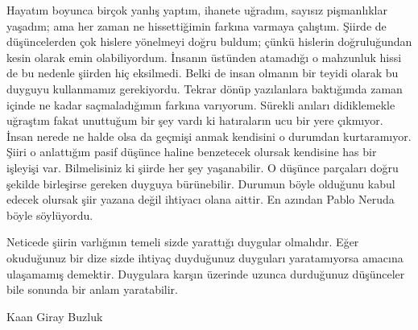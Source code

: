 \noindent\newline
Hayatım boyunca birçok yanlış yaptım, ihanete uğradım, sayısız pişmanlıklar yaşadım; ama her zaman ne hissettiğimin farkına varmaya çalıştım. Şiirde de düşüncelerden çok hislere yönelmeyi doğru buldum; çünkü hislerin doğruluğundan kesin olarak emin olabiliyordum. İnsanın üstünden atamadığı o mahzunluk hissi de bu nedenle şiirden hiç eksilmedi. Belki de insan olmanın bir teyidi olarak bu duyguyu kullanmamız gerekiyordu.
Tekrar dönüp yazılanlara baktığımda zaman içinde ne kadar saçmaladığımın farkına varıyorum. Sürekli anıları didiklemekle uğraştım fakat unuttuğum bir şey vardı ki hatıraların ucu bir yere çıkmıyor. İnsan nerede ne halde olsa da geçmişi anmak kendisini o durumdan kurtaramıyor. Şiiri o anlattığım pasif düşünce haline benzetecek olursak kendisine has bir işleyişi var. Bilmelisiniz ki şiirde her şey yaşanabilir. O düşünce parçaları doğru şekilde birleşirse gereken duyguya bürünebilir. Durumun böyle olduğunu kabul edecek olursak şiir yazana değil ihtiyacı olana aittir. En azından Pablo Neruda böyle söylüyordu.

\noindent\newline
Neticede şiirin varlığının temeli sizde yarattığı duygular olmalıdır. Eğer okuduğunuz bir dize sizde ihtiyaç duyduğunuz duyguları yaratamıyorsa amacına ulaşamamış demektir. Duygulara karşın üzerinde uzunca durduğunuz düşünceler bile sonunda bir anlam yaratabilir.

\begin{flushright}
    Kaan Giray Buzluk
\end{flushright}